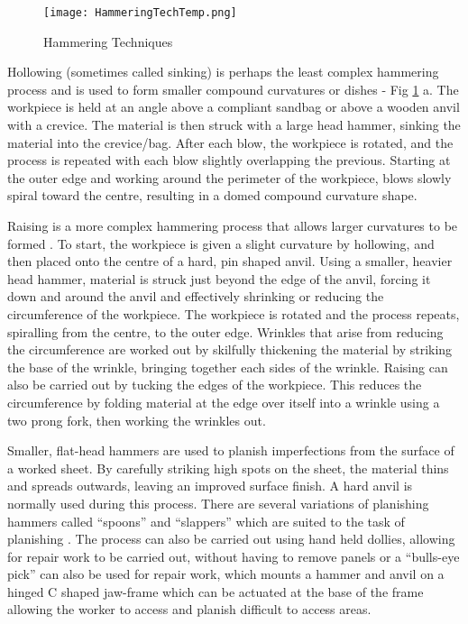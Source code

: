 \begin{figure}[h]
	\centering
    \texttt{[image: HammeringTechTemp.png]}
    \caption{Hammering Techniques}
    \label{fig:hammeringtechnique}
\end{figure}

Hollowing (sometimes called sinking) is perhaps the least complex hammering process and is used to form smaller compound curvatures or dishes - Fig \ref{fig:hammeringtechnique} a. The workpiece is held at an angle above a compliant sandbag or above a wooden anvil with a crevice. The material is then struck with a large head hammer, sinking the material into the crevice/bag. After each blow, the workpiece is rotated, and the process is repeated with each blow slightly overlapping the previous. Starting at the outer edge and working around the perimeter of the workpiece, blows slowly spiral toward the centre, resulting in a domed compound curvature shape. %

Raising is a more complex hammering process that allows larger curvatures to be formed \citep{Livesey2019TheBodies}. To start, the workpiece is given a slight curvature by hollowing, and then placed onto the centre of a hard, pin shaped anvil. Using a smaller, heavier head hammer, material is struck just beyond the edge of the anvil, forcing it down and around the anvil and effectively shrinking or reducing the circumference of the workpiece. The workpiece is rotated and the process repeats, spiralling from the centre, to the outer edge. Wrinkles that arise from reducing the circumference are worked out by skilfully thickening the material by striking the base of the wrinkle, bringing together each sides of the wrinkle.  Raising can also be carried out by tucking the edges of the workpiece. This reduces the circumference by folding material at the edge over itself into a wrinkle using a two prong fork, then working the wrinkles out. %

Smaller, flat-head hammers are used to planish imperfections from the surface of a worked sheet. By carefully striking high spots on the sheet, the material thins and spreads outwards, leaving an improved surface finish. A hard anvil is normally used during this process. There are several variations of planishing hammers called ``spoons'' and ``slappers'' which are suited to the task of planishing \citep{Barr2013ProfessionalFabrication}. The process can also be carried out using hand held dollies, allowing for repair work to be carried out, without having to remove panels or a ``bulls-eye pick'' can also be used for repair work, which mounts a hammer and anvil on a hinged C shaped jaw-frame which can be actuated at the base of the frame allowing the worker to access and planish difficult to access areas.


